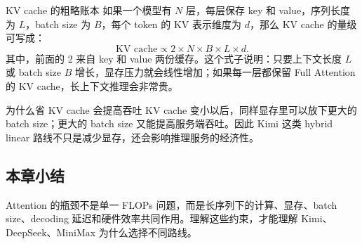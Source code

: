 \begin{knowledgebox}{KV cache 的粗略账本}
如果一个模型有 \(N\) 层，每层保存 key 和 value，序列长度为 \(L\)，batch size 为 \(B\)，每个 token 的 KV 表示维度为 \(d\)，那么 KV cache 的量级可写成：
\[
\text{KV cache} \propto 2 \times N \times B \times L \times d.
\]
其中，前面的 2 来自 key 和 value 两份缓存。这个式子说明：只要上下文长度 \(L\) 或 batch size \(B\) 增长，显存压力就会线性增加；如果每一层都保留 Full Attention 的 KV cache，长上下文推理会非常贵。
\end{knowledgebox}

\begin{importantbox}{为什么省 KV cache 会提高吞吐}
KV cache 变小以后，同样显存里可以放下更大的 batch size；更大的 batch size 又能提高服务端吞吐。因此 Kimi 这类 hybrid linear 路线不只是减少显存，还会影响推理服务的经济性。
\end{importantbox}

\subsection{本章小结}

Attention 的瓶颈不是单一 FLOPs 问题，而是长序列下的计算、显存、batch size、decoding 延迟和硬件效率共同作用。理解这些约束，才能理解 Kimi、DeepSeek、MiniMax 为什么选择不同路线。

